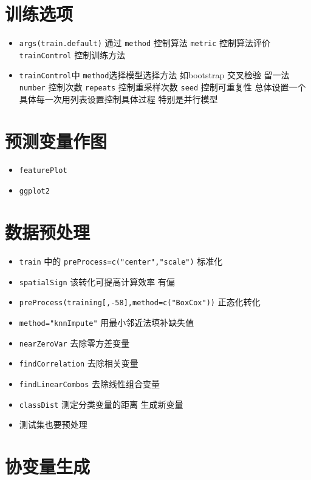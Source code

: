 \documentclass[]{book}
\providecommand{\tightlist}{%
  \setlength{\itemsep}{0pt}\setlength{\parskip}{0pt}}
\begin{document}
\section{训练选项}

\begin{itemize}
\tightlist
\item
  \texttt{args(train.default)} 通过 \texttt{method} 控制算法 \texttt{metric} 控制算法评价 \texttt{trainControl} 控制训练方法
\item
  \texttt{trainControl}中 \texttt{method}选择模型选择方法 如bootstrap 交叉检验 留一法 \texttt{number} 控制次数 \texttt{repeats} 控制重采样次数 \texttt{seed} 控制可重复性 总体设置一个 具体每一次用列表设置控制具体过程 特别是并行模型
\end{itemize}

\section{预测变量作图}

\begin{itemize}
\tightlist
\item
  \texttt{featurePlot}
\item
  \texttt{ggplot2}
\end{itemize}

\section{数据预处理}

\begin{itemize}
\tightlist
\item
  \texttt{train} 中的 \texttt{preProcess=c("center","scale")} 标准化
\item
  \texttt{spatialSign} 该转化可提高计算效率 有偏
\item
  \texttt{preProcess(training{[},-58{]},method=c("BoxCox"))} 正态化转化
\item
  \texttt{method="knnImpute"} 用最小邻近法填补缺失值
\item
  \texttt{nearZeroVar} 去除零方差变量
\item
  \texttt{findCorrelation} 去除相关变量
\item
  \texttt{findLinearCombos} 去除线性组合变量
\item
  \texttt{classDist} 测定分类变量的距离 生成新变量
\item
  测试集也要预处理
\end{itemize}

\section{协变量生成}
\end{document}
